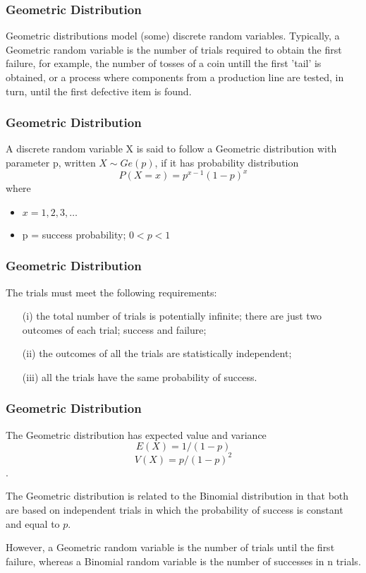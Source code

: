 \documentclass[IntroMain.tex]{subfiles}
\begin{document}
\begin{frame}
	\frametitle{Geometric Distribution}
	\Large
Geometric distributions model (some) discrete random variables. Typically, a Geometric random variable is the number of trials required to obtain the first failure, for example, the number of tosses of a coin untill the first 'tail' is obtained, or a process where components from a production line are tested, in turn, until the first defective item is found.
\end{frame}
\begin{frame}
	\frametitle{Geometric Distribution}
	\Large
A discrete random variable X is said to follow a Geometric distribution with parameter p, written $X \sim Ge(p)$, if it has probability distribution
\[P(X=x) = p^{x-1}(1-p)^x\]
where
\begin{itemize}
\item $x = 1, 2, 3, \ldots$
\item p = success probability; $0 < p < 1$
\end{itemize}
\end{frame}
\begin{frame}
	\frametitle{Geometric Distribution}
	\Large
The trials must meet the following requirements:

\begin{itemize}
\item[(i)] the total number of trials is potentially infinite;
there are just two outcomes of each trial; success and failure;
\item[(ii)] the outcomes of all the trials are statistically independent;
\item[(iii)] all the trials have the same probability of success.
\end{itemize}
\end{frame}
\begin{frame}
	\frametitle{Geometric Distribution}
	\Large
The Geometric distribution has expected value and variance  \[E(X)= 1/(1-p)\] \[V(X)=p/{(1-p)^2}\].

The Geometric distribution is related to the Binomial distribution in that both are based on independent trials in which the probability of success is constant and equal to $p$. 

However, a Geometric random variable is the number of trials until the first failure, whereas a Binomial random variable is the number of successes in n trials.
\end{frame}
\end{document}
